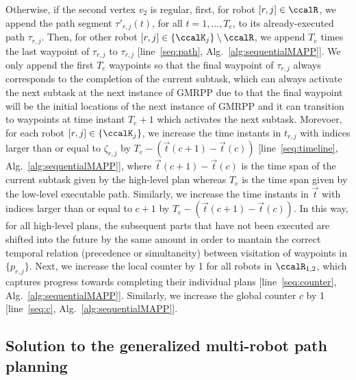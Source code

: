 \documentclass[Afour,sageh,times]{sagej}
\begin{document}
{{Otherwise, if the second vertex $v_2$ is regular, first, for robot $[r, j] \in \ccalR$, we append the path segment $\tau'_{r,j}(t)$, for all $t=1,\ldots, T_e$, to its already-executed path $\tau_{r,j}$. Then, for other robot $[r,j] \in \{\ccalK_j\}\setminus \ccalR$, we  append  $T_e$ times the last waypoint of  $\tau_{r,j}$  to $\tau_{r,j}$ [line~\ref{seq:path}, Alg.~\ref{alg:sequentialMAPP}]. We only append the first $T_e$ waypoints so that the final waypoint of $\tau_{r,j}$ always corresponds to the completion of the current  subtask, which can always activate the next subtask at the next instance of GMRPP due to that the final waypoint will be the initial locations of the next instance of GMRPP and it  can transition to waypoints at time instant $T_e+1$ which activates the next subtask.  Morevoer, for each robot $[r,j] \in \{\ccalK_j\}$, we increase the time instants in $t_{r,j}$ with indices larger than or equal to  $\zeta_{r,j}$ by $T_e - (\vec{t}(c+1) - \vec{t}(c))$ [line~\ref{seq:timeline}, Alg.~\ref{alg:sequentialMAPP}], where $\vec{t}(c+1) - \vec{t}(c)$ is the time span of the current subtask  given by the high-level plan whereas $T_e$ is the time span given by the low-level executable path.
    Similarly, we increase the time instants in $\vec{t}$ with indices larger than or equal to  $c+1$ by $T_e - (\vec{t}(c+1)- \vec{t}(c))$.
    In this way, for all high-level plans, the subsequent parts that have not been executed are shifted into the future by the same amount in order to mantain the correct temporal relation (precedence or simultaneity) between visitation of waypoints in $\{p_{r,j}\}$. Next, we increase  the local counter by 1 for all robots in $\ccalR_{1,2}$, which captures progress towards completing their individual plans [line~\ref{seq:counter}, Alg.~\ref{alg:sequentialMAPP}]. Similarly, we increase the global counter $c$ by 1 [line~\ref{seq:c}, Alg.~\ref{alg:sequentialMAPP}].}


\subsection{Solution to the generalized multi-robot path planning}\label{sec:solution2mapp}


}
\end{document}
